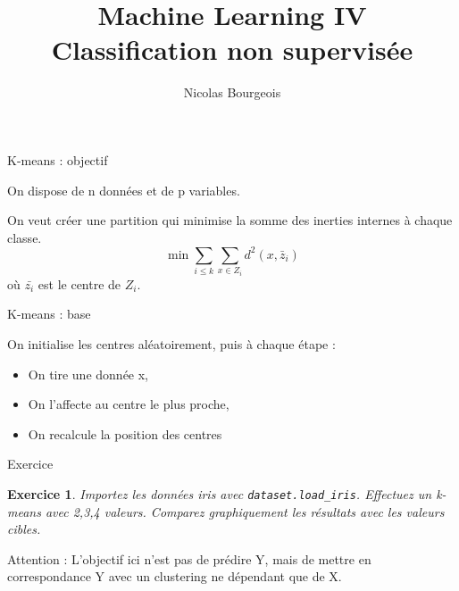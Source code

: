 \documentclass[11pt]{beamer}
\title{Machine Learning IV \\ Classification non supervisée}
\author{Nicolas Bourgeois}
\date{}
\newtheorem{exercice}{Exercice}
\begin{document}
\begin{frame}
\maketitle
\end{frame}

\begin{frame}{K-means : objectif}

On dispose de n données et de p variables.\\

\pause
\vspace{0.2cm}

On veut créer une partition qui minimise la somme des inerties internes à chaque classe.\\

$$\min \sum_{i \leq k} \sum_{x \in Z_i} d^2(x,\bar{z}_i)$$
où $\bar{z_i}$ est le centre de $Z_i$.

\end{frame}

\begin{frame}{K-means : base}

On initialise les centres aléatoirement, puis à chaque étape :
\pause
\begin{itemize}
	\item On tire une donnée x,
	\item On l'affecte au centre le plus proche,
	\item On recalcule la position des centres
\end{itemize}

\end{frame}


\begin{frame}{Exercice}

\begin{exercice}
Importez les données iris avec \texttt{dataset.load\_iris}. Effectuez un k-means avec 2,3,4 valeurs. Comparez graphiquement les résultats avec les valeurs cibles.
\end{exercice}

Attention : L'objectif ici n'est pas de prédire Y, mais de mettre en correspondance Y avec un clustering ne dépendant que de X.

\end{frame}
\end{document}
